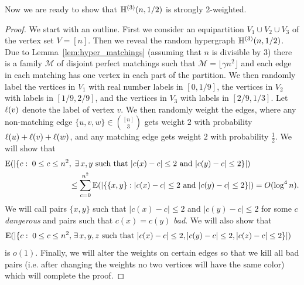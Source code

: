 \documentclass[12pt,reqno]{amsart}
\begin{document}
Now we are ready to show that \whp $\mathbb{H}^{({3})}(n,1/2)$ is strongly 2-weighted.
\begin{proof}

We start with an outline. First we consider an equipartition $V_1 \cup V_2 \cup V_3$ of the vertex set $V=[n]$.  Then we reveal the random hypergraph $\mathbb{H}^{({3})}(n,1/2)$. Due to Lemma~\ref{lem:hyper_matchings} (assuming that $n$ is divisible by 3) there is \whp a family $\mathcal{M}$ of disjoint perfect matchings such that $\mathcal{M} = \lfloor \gamma  n^2 \rfloor$ and each edge in each matching has one vertex in each part of the partition. We then randomly label the vertices in $V_1$ with real number labels in $[0, 1/9]$, the vertices in $V_2$ with labels in $[1/9,  2/9]$, and the vertices in $V_3$ with labels in $[2/9,  1/3]$. Let $\ell(v)$ denote the label of vertex $v$. We then randomly weight the edges, where any non-matching edge $\{u,v,w\} \in \binom{[n]}{3}$ gets weight $2$ with probability $\ell(u)+\ell(v)+\ell(w)$, and any matching edge gets weight $2$ with probability $\frac 12$. 
We will show that 
\begin{align*}
\mathrm{E}(|\{c: \; 0 \le c \le n^2&, \; \exists\, x, y \mbox{ such that } |c(x)-c| \le 2 \text{ and } |c(y)-c| \le 2\} |)\\
& \le \sum_{c=0}^{n^2}\mathrm{E}(\left|\left\{ \{x, y\}:  |c(x)-c| \le 2 \text{ and } |c(y)-c| \le 2 \right\}\right|) = O(\log^4 n).
\end{align*}
We will call pairs $\{x, y\}$ such that  $ |c(x)-c| \le 2$ and  $|c(y)-c| \le 2$ for some $c$ \emph{dangerous} and pairs such that $c(x) = c(y)$ \emph{bad}.  We will also show that 
\begin{align*}
\mathrm{E}(|\{c: \; 0 \le c \le n^2, \; &\exists\, x, y, z \mbox{ such that } |c(x)-c|\le 2, |c(y)-c|\le 2, |c(z)-c| \le 2\} |)
\end{align*}
is $o(1)$.
Finally, we will alter the weights on certain edges so that we kill all bad pairs (i.e. after changing the weights no two vertices will have the same color) which will complete the proof.


\end{proof}
\end{document}
